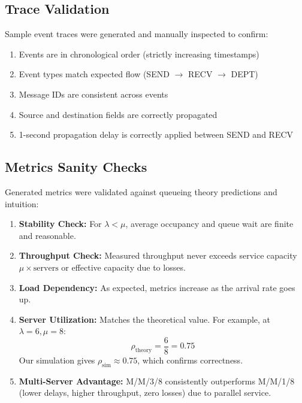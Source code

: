 \documentclass[12pt]{article}
\begin{document}
\subsection{Trace Validation}

Sample event traces were generated and manually inspected to confirm:

\begin{enumerate}
    \item Events are in chronological order (strictly increasing timestamps)
    \item Event types match expected flow (SEND $\to$ RECV $\to$ DEPT)
    \item Message IDs are consistent across events
    \item Source and destination fields are correctly propagated
    \item 1-second propagation delay is correctly applied between SEND and RECV
\end{enumerate}

\subsection{Metrics Sanity Checks}

Generated metrics were validated against queueing theory predictions and intuition:

\begin{enumerate}
    \item \textbf{Stability Check:} For $\lambda < \mu$, average occupancy and queue wait are finite and reasonable.

    \item \textbf{Throughput Check:} Measured throughput never exceeds service capacity $\mu \times \text{servers}$ or effective capacity due to losses.

    \item \textbf{Load Dependency:} As expected, metrics increase as the arrival rate goes up.

    \item \textbf{Server Utilization:} Matches the theoretical value. For example, at $\lambda = 6, \mu = 8$:
          \begin{equation}
              \rho_{\text{theory}} = \frac{6}{8} = 0.75
          \end{equation}
          Our simulation gives $\rho_{\text{sim}} \approx 0.75$, which confirms correctness.

    \item \textbf{Multi-Server Advantage:} M/M/3/8 consistently outperforms M/M/1/8 (lower delays, higher throughput, zero losses) due to parallel service.
\end{enumerate}
\end{document}
